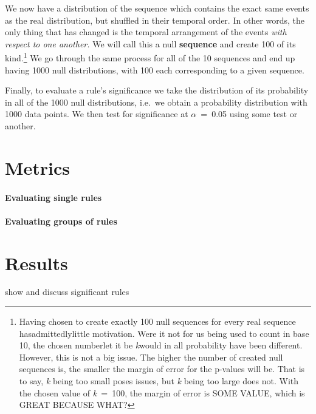 We now have a distribution of the sequence which contains the exact same events as the real distribution, but shuffled in their temporal order.
In other words, the only thing that has changed is the temporal arrangement of the events \emph{with respect to one another.} We will call this a null \textbf{sequence} and create 100 of its kind.\footnote{Having chosen to create exactly 100 null sequences for every real sequence has\dash admittedly\dash little motivation.
Were it not for us being used to count in base 10, the chosen number\dash let it be \textit{k}\dash would in all probability have been different.
However, this is not a big issue.
The higher the number of created null sequences is, the smaller the margin of error for the p-values will be.
That is to say, \textit{k} being too small poses issues, but \textit{k} being too large does not.
With the chosen value of \textit{k}~=~100, the margin of error is SOME VALUE, which is GREAT BECAUSE WHAT?}
We go through the same process for all of the 10 sequences and end up having 1000 null distributions, with 100 each corresponding to a given sequence.

Finally, to evaluate a rule's significance we take the distribution of its probability in all of the 1000 null distributions, i.e.~we obtain a probability distribution with 1000 data points.
We then test for significance at \(\alpha\)~=~0.05 using some test or another.

%
%

\section{Metrics}
\label{sec:sigmetrics}
\paragraph{Evaluating single rules}
\paragraph{Evaluating groups of rules}
\section{Results}
\label{sec:sigres}
show and discuss significant rules




